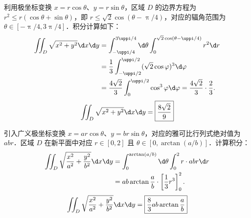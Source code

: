 \begin{solution}

    利用极坐标变换 $x = r \cos \theta$、$y = r \sin \theta$，区域 $D$ 的边界方程为 $r^2 \le r(\cos \theta + \sin \theta)$，即 $r \le \sqrt{2} \cos(\theta - \uppi/4)$，对应的辐角范围为 $\theta \in [-\uppi/4, 3\uppi/4]$．积分计算如下：
    \begin{equation}
        \begin{aligned}
            \iint_D \sqrt{x^2+y^2} \d x \d y & = \int_{-\uppi/4}^{3\uppi/4} \d \theta \int_0^{\sqrt{2}\cos(\theta - \uppi/4)} r^2 \d r                   \\
                                             & = \frac{1}{3} \int_{-\uppi/2}^{\uppi/2} (\sqrt{2}\cos \varphi)^3 \d \varphi \label{eq:int-1-step}         \\
                                             & = \frac{4\sqrt{2}}{3} \int_0^{\uppi/2} \cos^3 \varphi \d \varphi = \frac{4\sqrt{2}}{3} \cdot \frac{2}{3}.
        \end{aligned}
    \end{equation}
    \begin{equation}
        \iint_D \sqrt{x^2+y^2} \d x \d y = \boxed{\frac{8\sqrt{2}}{9}}
    \end{equation}


    引入广义极坐标变换 $x = ar\cos\theta$、$y = br\sin\theta$，对应的雅可比行列式绝对值为 $abr$．区域 $D$ 在新平面中对应 $r \in [0, 2]$ 且 $\theta \in [0, \arctan(a/b)]$．计算积分：
    \begin{equation}
        \begin{aligned}
            \iint_D \sqrt{\frac{x^2}{a^2} + \frac{y^2}{b^2}} \d x \d y & = \int_0^{\arctan(a/b)} \d \theta \int_0^2 r \cdot abr \d r      \\
                                                                       & = ab \arctan\frac{a}{b} \cdot \left[ \frac{1}{3}r^3 \right]_0^2.
        \end{aligned}
    \end{equation}
    \begin{equation}
        \iint_D \sqrt{\frac{x^2}{a^2} + \frac{y^2}{b^2}} \d x \d y = \boxed{\frac{8}{3}ab \arctan\frac{a}{b}}
    \end{equation}



\end{solution}
